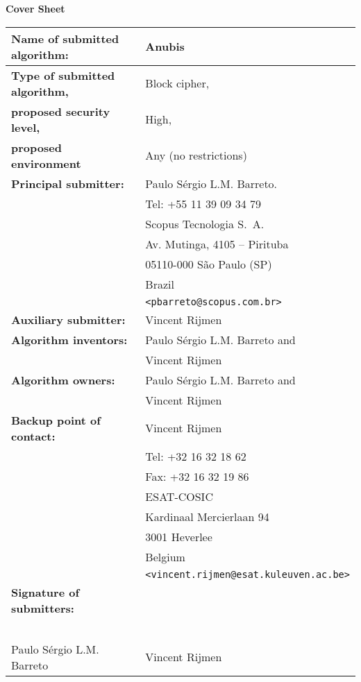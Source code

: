 \documentclass[11pt]{letter}
\begin{document}
\pagestyle{empty}

\begin{center}
{\Huge \sf \textbf{Cover Sheet}}
\end{center}

\vspace{1.0cm}

\begin{tabular}{ll}\hline
\textbf{Name of submitted algorithm:} & {\sc Anubis} \\ \hline %
\textbf{Type of submitted algorithm,} & Block cipher, \\
\textbf{proposed security level,} & High, \\
\textbf{proposed environment} & Any (no restrictions)\\ \hline %
\textbf{Principal submitter:} & %
Paulo S\'{e}rgio L.M. Barreto. \\
& Tel: +55 11 39 09 34 79 \\
& Scopus Tecnologia S.~A.\\
& Av. Mutinga, 4105 -- Pirituba \\
& 05110-000 S\~{a}o Paulo (SP) \\
& Brazil\\
& {\tt <pbarreto@scopus.com.br>}\\ \hline %
\textbf{Auxiliary submitter:} & Vincent Rijmen \\ \hline %
\textbf{Algorithm inventors:} & Paulo S\'{e}rgio L.M.
Barreto and \\
& Vincent Rijmen \\ \hline %
\textbf{Algorithm owners:} & Paulo S\'{e}rgio L.M.
Barreto and \\
& Vincent Rijmen \\ \hline %
\textbf{Backup point of contact:} & Vincent Rijmen \\
& Tel: +32 16 32 18 62 \\
& Fax: +32 16 32 19 86 \\
& ESAT-COSIC\\
& Kardinaal Mercierlaan 94\\
& 3001 Heverlee \\
& Belgium \\
& {\tt <vincent.rijmen@esat.kuleuven.ac.be>} \\ \hline
\textbf{Signature of submitters:} & \\
& \\
& \\
& \\
& \\
& \\
Paulo S\'{e}rgio L.M. Barreto & Vincent Rijmen \\ \hline %
\end{tabular}
\end{document}
